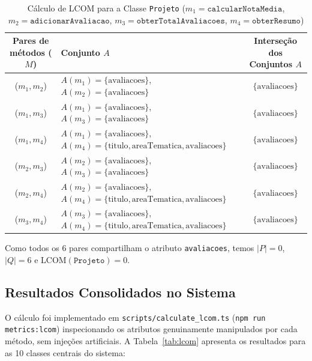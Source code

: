 \documentclass[12pt]{article}
\begin{document}
\begin{table}[H]
\centering
\scriptsize
\setlength{\tabcolsep}{4pt}
\begin{tabular}{|c|p{7.2cm}|c|}
\hline
\textbf{Pares de métodos ($M$)} & \textbf{Conjunto $A$} & \textbf{Interseção dos Conjuntos $A$} \\ \hline
($m_1, m_2$) & $A(m_1)=\{\text{avaliacoes}\}$, $A(m_2)=\{\text{avaliacoes}\}$ & $\{\text{avaliacoes}\}$ \\ \hline
($m_1, m_3$) & $A(m_1)=\{\text{avaliacoes}\}$, $A(m_3)=\{\text{avaliacoes}\}$ & $\{\text{avaliacoes}\}$ \\ \hline
($m_1, m_4$) & $A(m_1)=\{\text{avaliacoes}\}$, $A(m_4)=\{\text{titulo}, \text{areaTematica}, \text{avaliacoes}\}$ & $\{\text{avaliacoes}\}$ \\ \hline
($m_2, m_3$) & $A(m_2)=\{\text{avaliacoes}\}$, $A(m_3)=\{\text{avaliacoes}\}$ & $\{\text{avaliacoes}\}$ \\ \hline
($m_2, m_4$) & $A(m_2)=\{\text{avaliacoes}\}$, $A(m_4)=\{\text{titulo}, \text{areaTematica}, \text{avaliacoes}\}$ & $\{\text{avaliacoes}\}$ \\ \hline
($m_3, m_4$) & $A(m_3)=\{\text{avaliacoes}\}$, $A(m_4)=\{\text{titulo}, \text{areaTematica}, \text{avaliacoes}\}$ & $\{\text{avaliacoes}\}$ \\ \hline
\end{tabular}
\caption{Cálculo de LCOM para a Classe \texttt{Projeto} ($m_1 = \texttt{calcularNotaMedia}$, $m_2 = \texttt{adicionarAvaliacao}$, $m_3 = \texttt{obterTotalAvaliacoes}$, $m_4 = \texttt{obterResumo}$)}
\label{tab:lcom_exemplo}
\end{table}

Como todos os 6 pares compartilham o atributo \texttt{avaliacoes}, temos $|P| = 0$, $|Q| = 6$ e $\text{LCOM}(\texttt{Projeto}) = 0$.

\subsection{Resultados Consolidados no Sistema}

O cálculo foi implementado em \texttt{scripts/calculate\_lcom.ts} (\texttt{npm run metrics:lcom}) inspecionando os atributos genuinamente manipulados por cada método, sem injeções artificiais. A Tabela~\ref{tab:lcom} apresenta os resultados para as 10 classes centrais do sistema:
\end{document}
